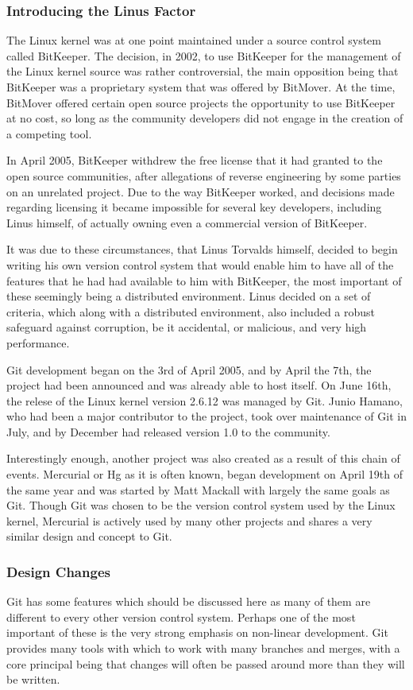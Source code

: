 \subsubsection{Introducing the Linus Factor}
The Linux kernel was at one point maintained under a source control system called BitKeeper.  The decision, in 2002, to use BitKeeper for the management of the Linux kernel source was rather controversial, the main opposition being that BitKeeper was a proprietary system that was offered by BitMover.  At the time, BitMover offered certain open source projects the opportunity to use BitKeeper at no cost, so long as the community developers did not engage in the creation of a competing tool.

In April 2005, BitKeeper withdrew the free license that it had granted to the open source communities, after allegations of reverse engineering by some parties on an unrelated project.  Due to the way BitKeeper worked, and decisions made regarding licensing it became impossible for several key developers, including Linus himself, of actually owning even a commercial version of BitKeeper.

It was due to these circumstances, that Linus Torvalds himself, decided to begin writing his own version control system that would enable him to have all of the features that he had had available to him with BitKeeper, the most important of these seemingly being a distributed environment.  Linus decided on a set of criteria, which along with a distributed environment, also included a robust safeguard against corruption, be it accidental, or malicious, and very high performance.

Git development began on the 3rd of April 2005, and by April the 7th, the project had been announced and was already able to host itself.  On June 16th, the relese of the Linux kernel version 2.6.12 was managed by Git.  Junio Hamano, who had been a major contributor to the project, took over maintenance of Git in July, and by December had released version 1.0 to the community.

Interestingly enough, another project was also created as a result of this chain of events.  Mercurial or Hg as it is often known, began development on April 19th of the same year and was started by Matt Mackall with largely the same goals as Git.  Though Git was chosen to be the version control system used by the Linux kernel, Mercurial is actively used by many other projects and shares a very similar design and concept to Git.

\subsubsection{Design Changes}
Git has some features which should be discussed here as many of them are different to every other version control system.  Perhaps one of the most important of these is the very strong emphasis on non-linear development.  Git provides many tools with which to work with many branches and merges, with a core principal being that changes will often be passed around more than they will be written.


